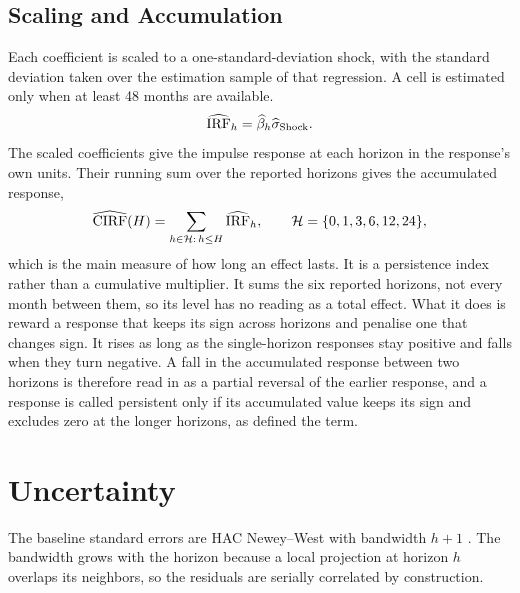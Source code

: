 \subsection{Scaling and Accumulation}

Each coefficient is scaled to a one-standard-deviation shock, with the standard deviation taken over the estimation sample of that regression. A cell is estimated only when at least 48 months are available.
\begin{equation}
  \widehat{\operatorname{IRF}}_{h}
  =
  \widehat{\beta}_{h}\widehat{\sigma}_{\mathrm{Shock}}.
  \label{eq:lp-normalization}
\end{equation}
The scaled coefficients give the impulse response at each horizon in the response's own units. Their running sum over the reported horizons gives the accumulated response,
\begin{equation}
  \widehat{\mathrm{CIRF}}(H)
  =
  \sum_{h \in \mathcal{H}:\, h \leq H} \widehat{\operatorname{IRF}}_{h},
  \qquad
  \mathcal{H} = \{0,1,3,6,12,24\},
  \label{eq:cumulative-response}
\end{equation}
which is the main measure of how long an effect lasts. It is a persistence index rather than a cumulative multiplier. It sums the six reported horizons, not every month between them, so its level has no reading as a total effect. What it does is reward a response that keeps its sign across horizons and penalise one that changes sign. It rises as long as the single-horizon responses stay positive and falls when they turn negative. A fall in the accumulated response between two horizons is therefore read in  as a partial reversal of the earlier response, and a response is called persistent only if its accumulated value keeps its sign and excludes zero at the longer horizons, as  defined the term.

\section{Uncertainty}
\label{sec:uncertainty}

The baseline standard errors are HAC Newey--West with bandwidth \(h+1\) \parencite{NeweyWest1987}. The bandwidth grows with the horizon because a local projection at horizon \(h\) overlaps its neighbors, so the residuals are serially correlated by construction.

